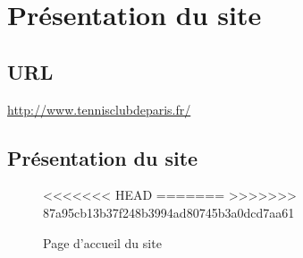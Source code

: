 \documentclass{article}[12pt]
\begin{document}


\tableofcontents%
\newpage


\section{Présentation du site}
\subsection{URL}
\url{http://www.tennisclubdeparis.fr/}
\subsection{Présentation du site}
\begin{figure}[H]
<<<<<<< HEAD
	\centering    {}
=======
	\centering    {}
>>>>>>> 87a95cb13b37f248b3994ad80745b3a0dcd7aa61
    \caption{Page d'accueil du site}
\end{figure}
\end{document}
